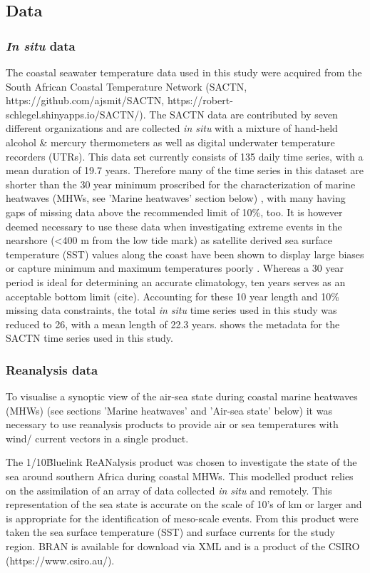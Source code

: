 \documentclass[a4paper,10pt,review]{elsarticle}
\begin{document}
\subsection{Data}
\subsubsection{\emph{In situ} data}
The coastal seawater temperature data used in this study were acquired from the South African Coastal Temperature Network (SACTN, https://github.com/ajsmit/SACTN, https://robert-schlegel.shinyapps.io/SACTN/). The SACTN data are contributed by seven different organizations and are collected \emph{in situ} with a mixture of hand-held alcohol \& mercury thermometers as well as digital underwater temperature recorders (UTRs). This data set currently consists of 135 daily time series, with a mean duration of 19.7 years. Therefore many of the time series in this dataset are shorter than the 30 year minimum proscribed for the characterization of marine heatwaves (MHWs, see 'Marine heatwaves' section below) \citep{Hobday2016}, with many having gaps of missing data above the recommended limit of 10\%, too. It is however deemed necessary to use these data when investigating extreme events in the nearshore (<400 m from the low tide mark) as satellite derived sea surface temperature (SST) values along the coast have been shown to display large biases \citep{Smit2013} or capture minimum and maximum temperatures poorly \citep{Smale2009, Castillo2010}. Whereas a 30 year period is ideal for determining an accurate climatology, ten years serves as an acceptable bottom limit (cite). Accounting for these 10 year length and 10\% missing data constraints, the total \emph{in situ} time series used in this study was reduced to 26, with a mean length of 22.3 years.  shows the metadata for the SACTN time series used in this study.

\subsubsection{Reanalysis data}
To visualise a synoptic view of the air-sea state during coastal marine heatwaves (MHWs) (see sections 'Marine heatwaves' and 'Air-sea state' below) it was necessary to use reanalysis products to provide air or sea temperatures with wind/ current vectors in a single product.

The 1/10\degree\~ Bluelink ReANalysis product was chosen to investigate the state of the sea around southern Africa during coastal MHWs. This modelled product relies on the assimilation of an array of data collected \emph{in situ} and remotely. This representation of the sea state is accurate on the scale of 10's of km or larger and is appropriate for the identification of meso-scale events. From this product were taken the sea surface temperature (SST) and surface currents for the study region. BRAN is available for download via XML and is a product of the CSIRO (https://www.csiro.au/).
\end{document}
